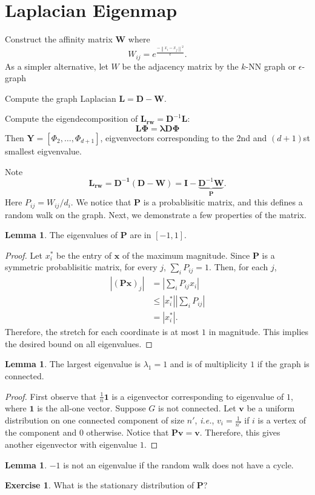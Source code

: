 \documentclass[11pt]{article}
\newcommand{\norm}[1]{\left\lVert#1\right\rVert}
\theoremstyle{definition}
\newtheorem{lemma}[theorem]{Lemma}
\newtheorem{exercise}{Exercise}
\begin{document}
\section{Laplacian Eigenmap}
\begin{steps}
\item Construct the affinity matrix $\bm{W}$ where 
    \[ 
    W_{ij} = e^{\frac{-\norm{x_i-x_j}^2}{\epsilon}}.
    \]
    As a simpler alternative, let $W$ be the adjacency matrix by the $k$-NN graph or $\epsilon$-graph
\item Compute the graph Laplacian $\bm{L} = \mathbf{D} - \bm{W}$.
\item Compute the eigendecomposition of $\bm{L_{rw}} = \bm{D}^{-1}\bm{L}$:
    \[
        \bm{L\Phi} =\bm{\lambda D \Phi}
    \]
    Then $\mathbf{Y} = [\Phi_2, \ldots, \Phi_{d+1}]$, eigvenvectors corresponding to the $2$nd and $(d+1)$st smallest eigvenvalue.
    \end{steps}
Note 
    \[
        \mathbf{L_{rw} = \bm{D}^{-1} (\bm{D}-\bm{W})} = \bm{I} - \underbrace{\bm{D}^{-1}\bm{W}}_{\bm{P}}.
    \]
    Here $P_{ij}= W_{ij} / d_i$.  We notice that $\mathbf{P}$ is a probablisitic matrix, and this defines a random walk on the graph. Next, we demonstrate a few properties of the matrix.
\begin{lemma}
     The eigenvalues of $\bm{P}$ are in $[-1,1]$.
\end{lemma}
\begin{proof}
    Let $x_i^*$ be the entry of $\bm{x}$ of the maximum magnitude. Since $\bm{P}$ is a symmetric probablisitic matrix, for every $j$, $\sum_{i} P_{ij} = 1$. Then, for each $j$,
    \begin{align*}
        \left|(\bm{P}\bm{x})_j\right| &= \left|\sum_{i} P_{ij}x_i\right|\\
                                &\leq |x_i^*|\left|\sum_{i} P_{ij}\right|\\
                                &=|x_i^*|.
    \end{align*}
    Therefore, the stretch for each coordinate is at most $1$ in magnitude. This implies the desired bound on all eigenvalues.
\end{proof}
\begin{lemma}
    The largest eigenvalue is $\lambda_1 =1$ and is of multiplicity $1$ if the graph is connected.
\end{lemma}
\begin{proof}
    First observe that $\frac{1}{n} \bm{1}$ is a eigenvector corresponding to eigenvalue of $1$, where $\bm{1}$ is the all-one vector. Suppose $G$ is not connected. Let $\bm{v}$ be a uniform distribution on one connected component of size $n'$, \textit{i.e.}, $v_i = \frac{1}{n'}$ if $i$ is a vertex of the component and $0$ otherwise. Notice that $\bm{P}\bm{v} =\bm{v}$. Therefore, this gives another eigenvector with eigenvalue $1$. 
\end{proof}
\begin{lemma}
     $-1$ is not an eigenvalue if the random walk does not have a cycle.
\end{lemma}
\begin{exercise}
    What is the stationary distribution of $\bm{P}$?
\end{exercise}


\end{document}
